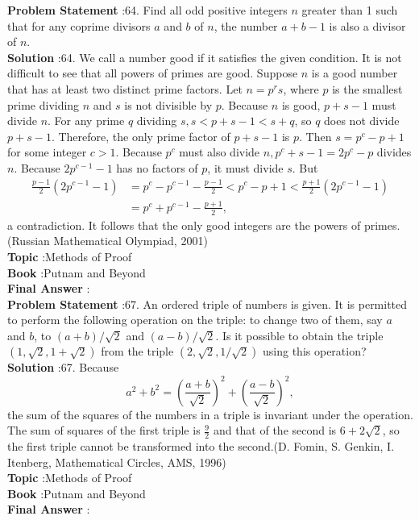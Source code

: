 \documentclass[10pt]{article}
\begin{document}
\textbf{Problem Statement} :64. Find all odd positive integers $n$ greater than 1 such that for any coprime divisors $a$ and $b$ of $n$, the number $a+b-1$ is also a divisor of $n$. \\
\textbf{Solution} :64. We call a number good if it satisfies the given condition. It is not difficult to see that all powers of primes are good. Suppose $n$ is a good number that has at least two distinct prime factors. Let $n=p^{r} s$, where $p$ is the smallest prime dividing $n$ and $s$ is not divisible by $p$. Because $n$ is good, $p+s-1$ must divide $n$. For any prime $q$ dividing $s, s<p+s-1<s+q$, so $q$ does not divide $p+s-1$. Therefore, the only prime factor of $p+s-1$ is $p$. Then $s=p^{c}-p+1$ for some integer $c>1$. Because $p^{c}$ must also divide $n, p^{c}+s-1=2 p^{c}-p$ divides $n$. Because $2 p^{c-1}-1$ has no factors of $p$, it must divide $s$. But$$ \begin{aligned} \frac{p-1}{2}\left(2 p^{c-1}-1\right) &=p^{c}-p^{c-1}-\frac{p-1}{2}<p^{c}-p+1<\frac{p+1}{2}\left(2 p^{c-1}-1\right) \\ &=p^{c}+p^{c-1}-\frac{p+1}{2}, \end{aligned} $$a contradiction. It follows that the only good integers are the powers of primes.(Russian Mathematical Olympiad, 2001)\\
\textbf{Topic} :Methods of Proof\\
\textbf{Book} :Putnam and Beyond\\
\textbf{Final Answer} :\\


\textbf{Problem Statement} :67. An ordered triple of numbers is given. It is permitted to perform the following operation on the triple: to change two of them, say $a$ and $b$, to $(a+b) / \sqrt{2}$ and $(a-b) / \sqrt{2}$. Is it possible to obtain the triple $(1, \sqrt{2}, 1+\sqrt{2})$ from the triple $(2, \sqrt{2}, 1 / \sqrt{2})$ using this operation?\\
\textbf{Solution} :67. Because$$ a^{2}+b^{2}=\left(\frac{a+b}{\sqrt{2}}\right)^{2}+\left(\frac{a-b}{\sqrt{2}}\right)^{2}, $$the sum of the squares of the numbers in a triple is invariant under the operation. The sum of squares of the first triple is $\frac{9}{2}$ and that of the second is $6+2 \sqrt{2}$, so the first triple cannot be transformed into the second.(D. Fomin, S. Genkin, I. Itenberg, Mathematical Circles, AMS, 1996)\\
\textbf{Topic} :Methods of Proof\\
\textbf{Book} :Putnam and Beyond\\
\textbf{Final Answer} :\\
\end{document}
